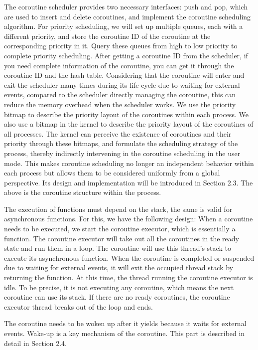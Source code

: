 \documentclass[10pt]{article}
\begin{document}
The coroutine scheduler provides two necessary interfaces: push and pop, which are used to insert and delete coroutines, and implement the coroutine scheduling algorithm. For priority scheduling, we will set up multiple queues, each with a different priority, and store the coroutine ID of the coroutine at the corresponding priority in it. Query these queues from high to low priority to complete priority scheduling. After getting a coroutine ID from the scheduler, if you need complete information of the coroutine, you can get it through the coroutine ID and the hash table. Considering that the coroutine will enter and exit the scheduler many times during its life cycle due to waiting for external events, compared to the scheduler directly managing the coroutine, this can reduce the memory overhead when the scheduler works. We use the priority bitmap to describe the priority layout of the coroutines within each process. We also use a bitmap in the kernel to describe the priority layout of the coroutines of all processes. The kernel can perceive the existence of coroutines and their priority through these bitmaps, and formulate the scheduling strategy of the process, thereby indirectly intervening in the coroutine scheduling in the user mode. This makes coroutine scheduling no longer an independent behavior within each process but allows them to be considered uniformly from a global perspective. Its design and implementation will be introduced in Section 2.3. The above is the coroutine structure within the process.

The execution of functions must depend on the stack, the same is valid for asynchronous functions. For this, we have the following design: When a coroutine needs to be executed, we start the coroutine executor, which is essentially a function. The coroutine executor will take out all the coroutines in the ready state and run them in a loop. The coroutine will use this thread's stack to execute its asynchronous function. When the coroutine is completed or suspended due to waiting for external events, it will exit the occupied thread stack by returning the function. At this time, the thread running the coroutine executor is idle. To be precise, it is not executing any coroutine, which means the next coroutine can use its stack. If there are no ready coroutines, the coroutine executor thread breaks out of the loop and ends.

The coroutine needs to be woken up after it yields because it waits for external events. Wake-up is a key mechanism of the coroutine. This part is described in detail in Section 2.4.
\end{document}

